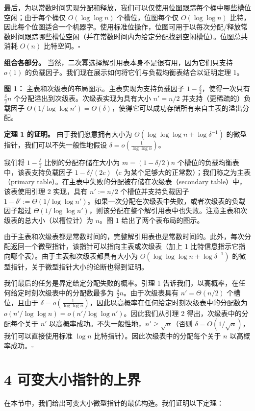 \documentclass[12pt,a4paper]{ctexart}
\theoremstyle{remark}
\begin{document}
最后，为以常数时间实现分配和释放，我们可以仅使用位图跟踪每个桶中哪些槽位空闲；由于每个桶仅 $O(\log\log n)$ 个槽位，位图每个仅 $O(\log\log n)$ 比特，因此每个位图适合一个机器字。使用标准位操作，位图可用于以每次分配/释放常数时间跟踪哪些槽位空闲（并在常数时间内为给定分配找到空闲槽位）。位图总共消耗 $O(n)$ 比特空间。$\square$

\textbf{组合各部分。} 当然，二次幂选择解引用表本身不是很有用，因为它们只支持 $o(1)$ 的负载因子。我们现在展示如何将它们与负载均衡表结合以证明定理 1。

\textbf{图 1：} 主表和次级表的布局图示。主表实现为支持负载因子 $1-\frac{\delta}{2}$，使得一次只有 $\frac{\delta}{2}n$ 个分配溢出到次级表。次级表实现为具有大小 $n'=n/2$ 并支持（更稀疏的）负载因子 $\Theta(1/\log\log n')=\Theta(\delta)$，使得它可以成功存储所有来自主表的溢出分配。

\textbf{定理 1 的证明。} 由于我们愿意拥有大小为 $\Theta(\log\log\log n+\log\delta^{-1})$ 的微型指针，我们可以不失一般性地假设 $\delta=o\left(\frac{1}{\log\log n}\right)$。

我们将 $1-\frac{\delta}{2}$ 比例的分配存储在大小为 $m=(1-\delta/2)n$ 个槽位的负载均衡表中，该表支持负载因子 $1-\delta/(2c)$（$c$ 为某个足够大的正常数）；我们称之为主表（primary table）。在主表中失败的分配被存储在次级表（secondary table）中，该表使用引理 2 实现，具有 $n':=n/2$ 个槽位并支持负载因子 $1-\delta':=\Theta(1/\log\log n')$。如果一次分配在次级表中失败，或者次级表的负载因子超过 $\Theta(1/\log\log n')$，则该分配在整个解引用表中也失败。注意主表和次级表的总大小（以槽位计）为 $n$。图 1 给出了两个表布局的图示。

由于主表和次级表都是常数时间的，完整解引用表也是常数时间的。此外，每次分配返回一个微型指针，该指针可以指向主表或次级表（加上 1 比特信息指示它指向哪个表）。由于主表和次级表都具有大小为 $O(\log\log\log n+\log\delta^{-1})$ 的微型指针，关于微型指针大小的论断也得到证明。

我们最后的任务是界定给定分配失败的概率。引理 1 告诉我们，以高概率，在任何给定时刻次级表中的分配数最多为 $\frac{\delta}{2}n$。由于次级表具有 $n'=\Theta(n/2)$ 个槽位，且由于 $\delta=o\left(\frac{1}{\log\log n}\right)$，因此以高概率在任何给定时刻次级表中的分配数为 $o(n'/\log\log n)=o(n'/\log\log n')$。因此我们从引理 2 得出，次级表中的分配每个关于 $n'$ 以高概率成功。不失一般性地，$n'\geq\sqrt{n}$（否则 $\delta=O(1/\sqrt{n})$，我们可以直接使用标准 $\log n$ 比特指针）。因此次级表中的分配每个关于 $n$ 以高概率成功。$\square$

\medskip
\section{4 可变大小指针的上界}
在本节中，我们给出可变大小微型指针的最优构造。我们证明以下定理：
\end{document}
